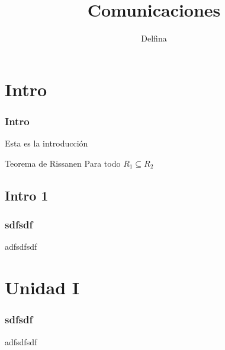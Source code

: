 \documentclass[11pt]{beamer}
\begin{document}
	\author{Delfina}
	\title{Comunicaciones}
	
	\begin{frame}[plain]
		\maketitle
	\end{frame}

	\section{Intro}
	\begin{frame}
		\tableofcontents
	\end{frame}
	
	\begin{frame}
		\frametitle{Intro}
		
		Esta es la \alert{introducción}
	
		\begin{block}{Teorema de Rissanen}
			Para todo $R_{1} \subseteq R_{2}$
		\end{block}
	\end{frame}

	\subsection{Intro 1}
	\begin{frame}
		\frametitle{sdfsdf}
		adfsdfsdf
	\end{frame}

	\section{Unidad I}
	\begin{frame}
		\frametitle{sdfsdf}
		adfsdfsdf
	\end{frame}
\end{document}
